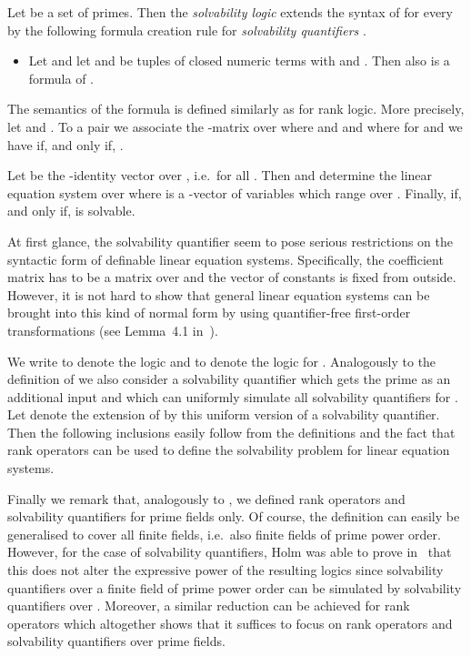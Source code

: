 \documentclass[a4paper,UKenglish]{lipics}
\theoremstyle{plain}
\begin{document}
\medskip
Let  be a set of primes. Then the \emph{solvability 
logic}  extends the syntax of  for every  by the following formula creation rule for \emph{solvability 
quantifiers} .
\begin{itemize}
 \item Let  and let 
  and  be tuples of closed numeric terms with  and .
  Then also  is a formula of . 
\end{itemize}


The semantics of the formula  is defined similarly as for rank logic.
More precisely, let  and . 
To a pair  we 
associate the -matrix  over  where  and  and where for  and  
we have  if, and only if, .

Let  be the -identity vector over , i.e.\ 
 for all . Then  and  
determine
the linear
equation system  over  where 
 is a -vector of variables  which range over 
. Finally,  if, and only if,  is solvable.

\smallskip
At first glance, the solvability quantifier seem to pose 
serious restrictions on 
the syntactic form of definable linear equation systems.
Specifically, the coefficient matrix has to be a matrix over  and
the vector of constants is fixed from outside.
However, it is not hard to show that general linear equation systems can 
be brought into this kind of normal form by using quantifier-free 
first-order transformations (see Lemma~4.1 in~\cite{DaGrHoKoPa13}).


We write  to denote the logic  and  to denote 
the logic  for . 
Analogously to the definition of  we also consider a 
solvability quantifier  which gets the prime  as an 
additional input and which can uniformly simulate all solvability 
quantifiers  for . 
Let  denote the extension of  by this uniform version of a 
solvability quantifier.
Then the following inclusions easily follow from the definitions and the fact 
that rank operators can be used to define the solvability problem for linear 
equation systems.


Finally we remark that, analogously to \cite{DaGrHoLa09}, we defined rank 
operators and solvability quantifiers for prime fields only. Of course, the 
definition can easily be generalised to cover all finite fields, i.e.\ also 
finite fields of prime power order. 
However, for the case of solvability quantifiers, Holm was able to prove 
in~\cite{Ho10} that this does not alter the expressive power of the resulting 
logics since solvability quantifiers over a finite field  of prime 
power order  can be simulated by solvability quantifiers over . Moreover, a similar reduction can be achieved for rank operators which 
altogether shows that it suffices to focus on rank operators and solvability 
quantifiers over prime fields.
\end{document}
